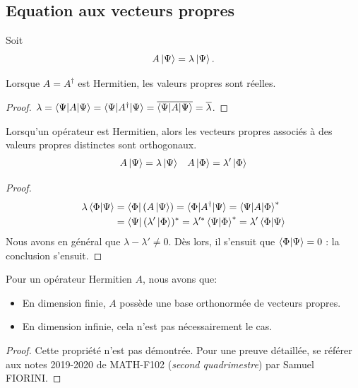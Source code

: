 \documentclass[../notesdecours.tex]{subfiles}
\begin{document}
\subsection{Equation aux vecteurs propres}
Soit 
\begin{equation}
A\ket{\Psi} = \lambda\ket{\Psi}.
\end{equation}
\begin{Property}
Lorsque $A=A^\dag$ est Hermitien, les valeurs propres sont réelles.
\end{Property}
\begin{proof}
$\lambda = \braket{\Psi|A|\Psi} = \braket{\Psi|A^\dag|\Psi} = \overline{\braket{\Psi|A|\Psi}} = \overline{\lambda}$.
\end{proof}
\begin{Property}
Lorsqu'un opérateur est Hermitien, alors les vecteurs propres associés à des valeurs propres distinctes sont orthogonaux.
\begin{align}
A\ket{\Psi} &= \lambda\ket{\Psi}		&A\ket{\Phi} = \lambda'\ket{\Phi}
\end{align}
\end{Property}
\begin{proof}
\begin{align*}
\lambda\braket{\Phi|\Psi} &= \bra{\Phi}(A\ket{\Psi}) = \braket{\Phi|A^\dag|\Psi} = \braket{\Psi|A|\Phi}^*\\
&= \bra{\Psi}(\lambda'\ket{\Phi})^* = \lambda'^* \braket{\Psi|\Phi}^* = \lambda' \braket{\Phi|\Psi}
\end{align*}
Nous avons en général que $\lambda - \lambda' \neq 0$. Dès lors, il s'ensuit que $\braket{\Phi|\Psi} = 0$ : la conclusion s'ensuit.
\end{proof}
\begin{Property}
Pour un opérateur Hermitien $A$, nous avons que:
\begin{itemize}
\item En dimension finie, $A$ possède une base orthonormée de vecteurs propres.
\item En dimension infinie, cela n'est pas nécessairement le cas.
\end{itemize}
\end{Property}
\begin{proof}
Cette propriété n'est pas démontrée. Pour une preuve détaillée, se référer aux notes 2019-2020 de MATH-F102 (\emph{second quadrimestre}) par Samuel FIORINI.
\end{proof}
\end{document}

